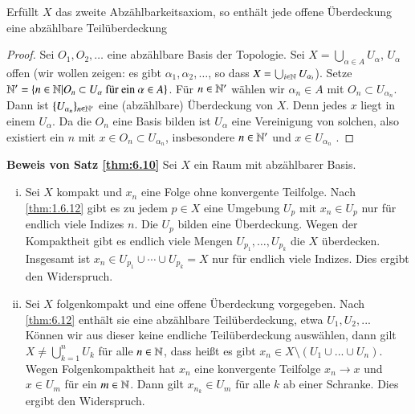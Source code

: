 \documentclass[a4paper,10pt]{scrartcl}
\begin{document}
\begin{lem}\label{thm:6.12}
 Erfüllt $X$ das zweite Abzählbarkeitsaxiom,  so enthält jede offene Überdeckung eine abzählbare Teilüberdeckung
\end{lem}
\begin{proof}
 Sei $O_1,O_2,\dotsc$ eine abzählbare Basis der Topologie. Sei $X=\bigcup_{\alpha\in A} U_\alpha$, $U_\alpha$ 
offen (wir wollen zeigen:  es gibt $\alpha_1, \alpha_2,\dotsc$, so dass $X=\bigcup_{i \in \mathbb{N}} U_{\alpha_i}$). 
Setze $\mathbb{N}'=\{n\in \mathbb{N}|O_n \subset U_\alpha \text{ für ein } \alpha \in A\}$.
Für $n\in \mathbb{N}'$ wählen wir $\alpha_n\in A$ mit $O_n\subset U_{\alpha_n}$. Dann ist $\{U_{\alpha_n}\}_{n\in \mathbb{N}'}$ eine (abzählbare) Überdeckung von $X$. 
Denn jedes $x$ liegt in einem $U_\alpha$. Da die $O_n$ eine Basis bilden ist $U_\alpha$ eine Vereinigung von solchen, also existiert ein $n$ mit $x\in O_n\subset U_{\alpha_n}$, insbesondere $n\in \mathbb{N}'$ und $x\in U_{\alpha_n}$ .
\end{proof}
\begin{seg}{\textbf{Beweis von Satz \ref{thm:6.10}}}
 Sei $X$ ein Raum mit abzählbarer Basis.
\begin{enumerate}[(i)]
 \item Sei $X$ kompakt und $x_n$ eine Folge ohne konvergente Teilfolge. Nach \ref{thm:1.6.12} gibt es zu jedem $p\in X$ eine Umgebung $U_p$ mit $x_n\in U_p$ nur für endlich viele Indizes $n$. Die $U_p$ bilden eine Überdeckung. Wegen der Kompaktheit gibt es endlich viele Mengen $U_{p_1}, \dotsc, U_{p_k}$ die $X$ überdecken. Insgesamt ist $x_n\in U_{p_1}\cup \dotsb \cup U_{p_k}=X$ nur für endlich viele Indizes. Dies ergibt den Widerspruch.
 \item Sei $X$ folgenkompakt und eine offene Überdeckung vorgegeben. Nach \ref{thm:6.12} enthält sie eine abzählbare Teilüberdeckung, etwa $U_1, U_2, ...$ Können wir aus dieser keine endliche Teilüberdeckung auswählen, dann gilt $X\neq \bigcup_{k=1}^nU_k$ für alle $n \in \mathbb{N}$, dass heißt es gibt $x_n\in X\setminus(U_1\cup...\cup U_n)$. Wegen Folgenkompaktheit hat $x_n$ eine konvergente Teilfolge $x_n \to x$ und $x\in U_m$ für ein $m\in \mathbb{N}$. Dann gilt $x_{n_k}\in U_m$ für alle $k$ ab einer Schranke. Dies ergibt den Widerspruch.
\end{enumerate}
\end{seg}
\end{document}
